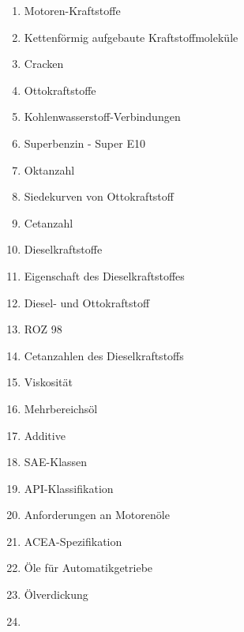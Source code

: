 \begin{enumerate}
\item
  Motoren-Kraftstoffe\\
\item
  Kettenförmig aufgebaute Kraftstoffmoleküle\\
\item
  Cracken\\
\item
  Ottokraftstoffe\\
\item
  Kohlenwasserstoff-Verbindungen\\
\item
  Superbenzin - Super E10\\
\item
  Oktanzahl\\
\item
  Siedekurven von Ottokraftstoff\\
\item
  Cetanzahl\\
\item
  Dieselkraftstoffe\\
\item
  Eigenschaft des Dieselkraftstoffes\\
\item
  Diesel- und Ottokraftstoff\\
\item
  ROZ 98\\
\item
  Cetanzahlen des Dieselkraftstoffs\\
\item
  Viskosität\\
\item
  Mehrbereichsöl\\
\item
  Additive\\
\item
  SAE-Klassen\\
\item
  API-Klassifikation\\
\item
  Anforderungen an Motorenöle\\
\item
  ACEA-Spezifikation\\
\item
  Öle für Automatikgetriebe\\
\item
  Ölverdickung\\
\item

\end{enumerate}

